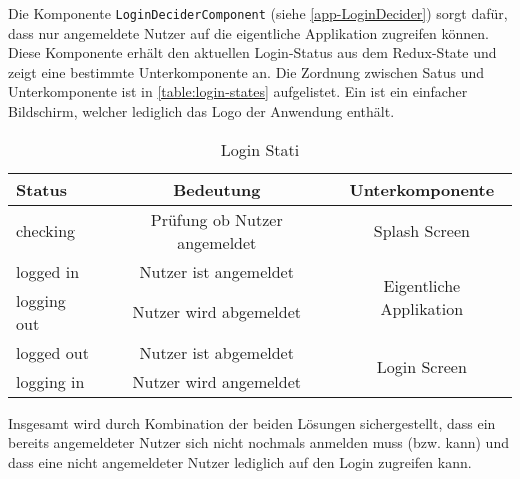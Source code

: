 

Die Komponente \texttt{LoginDeciderComponent} (siehe \autoref{app-LoginDecider}) sorgt dafür,
dass nur angemeldete Nutzer auf die eigentliche Applikation zugreifen können.
Diese Komponente erhält den aktuellen Login-Status aus dem Redux-State und zeigt eine bestimmte Unterkomponente an.
Die Zordnung zwischen Satus und Unterkomponente ist in \autoref{table:login-states} aufgelistet.
Ein  ist ein einfacher Bildschirm, welcher lediglich das Logo der Anwendung enthält.

\begin{table}[h!]
    \centering
     \begin{tabular}{| l | c | c |}
        \hline
        Status      & Bedeutung                      & Unterkomponente \\
        \hline\hline
        checking    & Prüfung ob Nutzer angemeldet   & Splash Screen\\
        \hline
        logged in   & Nutzer ist angemeldet          & \multirow{2}{*}{Eigentliche Applikation}\\
        \cline{1-2}
        logging out & Nutzer wird abgemeldet         & \\
        \hline
        logged out  & Nutzer ist abgemeldet          & \multirow{2}{*}{Login Screen} \\
        \cline{1-2}
        logging in  & Nutzer wird angemeldet         & \\
        \hline
     \end{tabular}
     \caption{Login Stati}
     \label{table:login-states}
\end{table}

Insgesamt wird durch Kombination der beiden Lösungen sichergestellt,
dass ein bereits angemeldeter Nutzer sich nicht nochmals anmelden muss (bzw. kann)
und dass eine nicht angemeldeter Nutzer lediglich auf den Login zugreifen kann.

